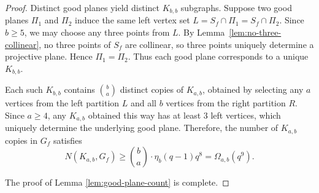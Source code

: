 \documentclass[10pt,a4paper]{amsart}
\begin{document}
\begin{proof}
Distinct good planes yield distinct $K_{b,b}$ subgraphs. Suppose two good planes $\Pi_1$ and $\Pi_2$ induce the same left vertex set $L = S_f \cap \Pi_1 = S_f \cap \Pi_2$. Since $b \geq 5$, we may choose any three points from $L$. By Lemma~\ref{lem:no-three-collinear}, no three points of $S_f$ are collinear, so three points uniquely determine a projective plane. Hence $\Pi_1 = \Pi_2$. Thus each good plane corresponds to a unique $K_{b,b}$.

Each such $K_{b,b}$ contains $\binom{b}{a}$ distinct copies of $K_{a,b}$, obtained by selecting any $a$ vertices from the left partition $L$ and all $b$ vertices from the right partition $R$. Since $a \geq 4$, any $K_{a,b}$ obtained this way has at least $3$ left vertices, which uniquely determine the underlying good plane. Therefore,  the number of $K_{a,b}$ copies in $G_f$ satisfies
\[
N(K_{a,b}, G_f) \geq \binom{b}{a} \cdot \eta_b (q-1) q^8 = \Omega_{a,b}(q^9).
\]

The proof of Lemma \ref{lem:good-plane-count} is complete.
\end{proof}
\end{document}
